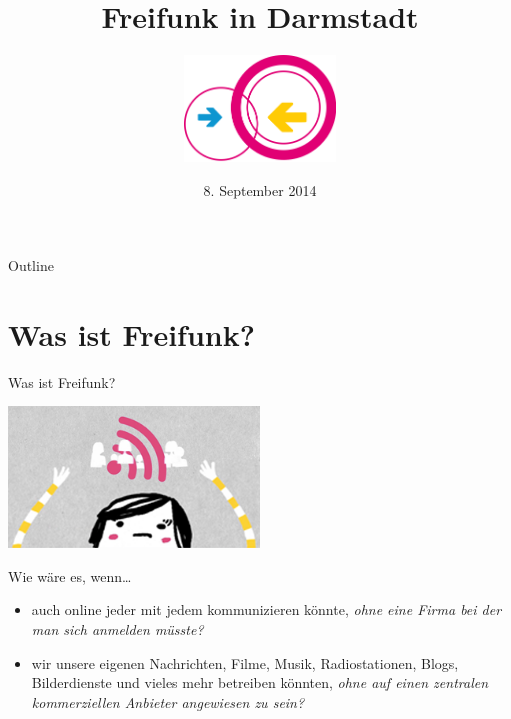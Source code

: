 \documentclass{beamer}
\title{Freifunk in Darmstadt}
\author{\includegraphics[width=4cm]{images/logo}}
\date{8. September 2014}
\begin{document}
\begin{frame}
\maketitle
\end{frame}


\begin{frame}{Outline}
\tableofcontents
\end{frame}

\section{Was ist Freifunk?}
\begin{frame}{Was ist Freifunk?}
\vfill
\begin{center}
\includegraphics[width=0.5\textwidth]{images/up}
\end{center}
\vfill
Wie wäre es, wenn\ldots
\vfill
\begin{itemize}
\pause\item auch online jeder mit jedem kommunizieren könnte\pause , \textit{ohne eine Firma bei der man sich anmelden müsste?}
\vfill
\pause\item wir unsere eigenen Nachrichten, Filme, Musik, Radiostationen, Blogs, Bilderdienste und vieles mehr betreiben könnten\pause ,  \textit{ohne auf einen zentralen kommerziellen Anbieter angewiesen zu sein?}
\end{itemize}
\end{frame}

\end{document}
